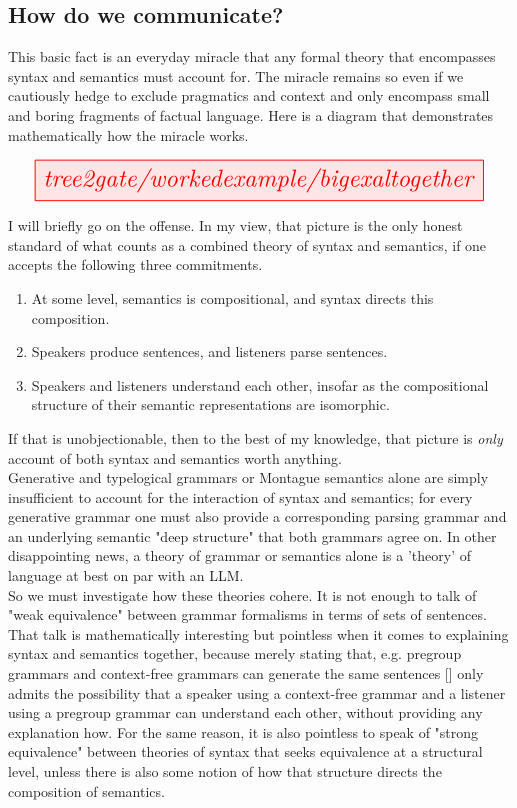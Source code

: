 \begin{fullwidth}

\section{How do we communicate?}

 This basic fact is an everyday miracle that any formal theory that encompasses syntax and semantics must account for. The miracle remains so even if we cautiously hedge to exclude pragmatics and context and only encompass small and boring fragments of factual language. Here is a diagram that demonstrates mathematically how the miracle works.

\[\resizebox{\textwidth}{!}{\tikzfig{tree2gate/workedexample/bigexaltogether}}\]

I will briefly go on the offense. In my view, that picture is the only honest standard of what counts as a combined theory of syntax and semantics, if one accepts the following three commitments.

\begin{enumerate}
\item{At some level, semantics is compositional, and syntax directs this composition.}
\item{Speakers produce sentences, and listeners parse sentences.}
\item{Speakers and listeners understand each other, insofar as the compositional structure of their semantic representations are isomorphic.}
\end{enumerate}

If that is unobjectionable, then to the best of my knowledge, that picture is \emph{only} account of both syntax and semantics worth anything.\\

Generative and typelogical grammars or Montague semantics alone are simply insufficient to account for the interaction of syntax and semantics; for every generative grammar one must also provide a corresponding parsing grammar and an underlying semantic "deep structure" that both grammars agree on. In other disappointing news, a theory of grammar or semantics alone is a 'theory' of language at best on par with an LLM.\\

So we must investigate how these theories cohere. It is not enough to talk of "weak equivalence" between grammar formalisms in terms of sets of sentences. That talk is mathematically interesting but pointless when it comes to explaining syntax and semantics together, because merely stating that, e.g. pregroup grammars and context-free grammars can generate the same sentences [] only admits the possibility that a speaker using a context-free grammar and a listener using a pregroup grammar can understand each other, without providing any explanation how. For the same reason, it is also pointless to speak of "strong equivalence" between theories of syntax that seeks equivalence at a structural level, unless there is also some notion of how that structure directs the composition of semantics.\\


\end{fullwidth}
